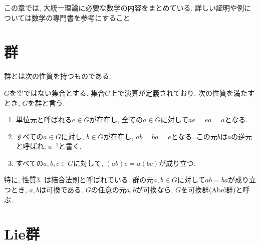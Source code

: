  この章では, 大統一理論に必要な数学の内容をまとめている.
 詳しい証明や例については数学の専門書を参考にすること
\section{群}
群とは次の性質を持つものである.
\begin{dfn}[群]
  $G$を空ではない集合とする. 集合$G$上で演算が定義されており, 次の性質を満たすとき, $G$を群と言う.
  \begin{enumerate}
    \item 単位元と呼ばれる$e\in G$が存在し, 全ての$a\in G$に対して$ae=ea=a$となる.
    \item すべての$a\in G$に対し, $b\in G$が存在し, $ab=ba=e$となる. この元$b$は$a$の逆元と呼ばれ, $a^{-1}$と書く.
    \item すべての$a, b, c \in G$に対して, $(ab)c=a(bc)$が成り立つ.
  \end{enumerate}
\end{dfn}
特に, 性質3. は結合法則と呼ばれている.
群の元$a, b\in G$に対して$ab=ba$が成り立つとき, $a, b$は可換である.
$G$の任意の元$a, b$が可換なら, $G$を可換群(Abel群)と呼ぶ.
\section{Lie群}



